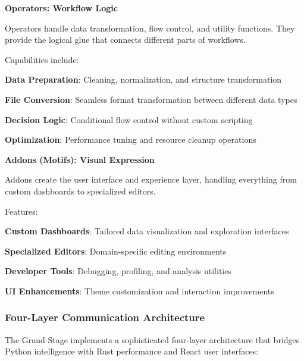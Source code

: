 \textbf{Operators: Workflow Logic}

Operators handle data transformation, flow control, and utility functions. They provide the logical glue that connects different parts of workflows.

Capabilities include:
\begin{compactlist}
    \item \textbf{Data Preparation}: Cleaning, normalization, and structure transformation
    \item \textbf{File Conversion}: Seamless format transformation between different data types
    \item \textbf{Decision Logic}: Conditional flow control without custom scripting
    \item \textbf{Optimization}: Performance tuning and resource cleanup operations
\end{compactlist}

\textbf{Addons (Motifs): Visual Expression}

Addons create the user interface and experience layer, handling everything from custom dashboards to specialized editors.

Features:
\begin{compactlist}
    \item \textbf{Custom Dashboards}: Tailored data visualization and exploration interfaces
    \item \textbf{Specialized Editors}: Domain-specific editing environments
    \item \textbf{Developer Tools}: Debugging, profiling, and analysis utilities
    \item \textbf{UI Enhancements}: Theme customization and interaction improvements
\end{compactlist}

\subsubsection{Four-Layer Communication Architecture}

The Grand Stage implements a sophisticated four-layer architecture that bridges Python intelligence with Rust performance and React user interfaces:

